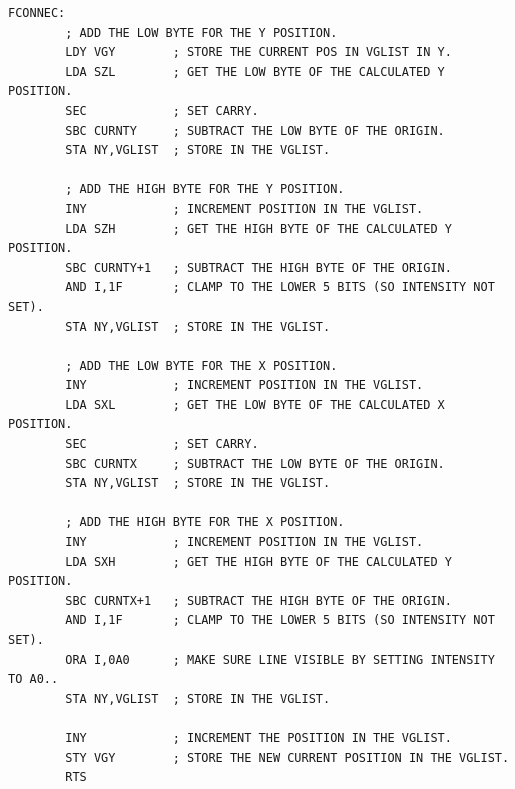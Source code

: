 \begin{lstlisting}
FCONNEC:
        ; ADD THE LOW BYTE FOR THE Y POSITION.
        LDY VGY        ; STORE THE CURRENT POS IN VGLIST IN Y.
        LDA SZL        ; GET THE LOW BYTE OF THE CALCULATED Y POSITION.
        SEC            ; SET CARRY.
        SBC CURNTY     ; SUBTRACT THE LOW BYTE OF THE ORIGIN.
        STA NY,VGLIST  ; STORE IN THE VGLIST.

        ; ADD THE HIGH BYTE FOR THE Y POSITION.
        INY            ; INCREMENT POSITION IN THE VGLIST.
        LDA SZH        ; GET THE HIGH BYTE OF THE CALCULATED Y POSITION.
        SBC CURNTY+1   ; SUBTRACT THE HIGH BYTE OF THE ORIGIN.
        AND I,1F       ; CLAMP TO THE LOWER 5 BITS (SO INTENSITY NOT SET).
        STA NY,VGLIST  ; STORE IN THE VGLIST.

        ; ADD THE LOW BYTE FOR THE X POSITION.
        INY            ; INCREMENT POSITION IN THE VGLIST.
        LDA SXL        ; GET THE LOW BYTE OF THE CALCULATED X POSITION.
        SEC            ; SET CARRY.
        SBC CURNTX     ; SUBTRACT THE LOW BYTE OF THE ORIGIN.
        STA NY,VGLIST  ; STORE IN THE VGLIST.

        ; ADD THE HIGH BYTE FOR THE X POSITION.
        INY            ; INCREMENT POSITION IN THE VGLIST.
        LDA SXH        ; GET THE HIGH BYTE OF THE CALCULATED Y POSITION.
        SBC CURNTX+1   ; SUBTRACT THE HIGH BYTE OF THE ORIGIN.
        AND I,1F       ; CLAMP TO THE LOWER 5 BITS (SO INTENSITY NOT SET).
        ORA I,0A0      ; MAKE SURE LINE VISIBLE BY SETTING INTENSITY TO A0..
        STA NY,VGLIST  ; STORE IN THE VGLIST.

        INY            ; INCREMENT THE POSITION IN THE VGLIST.
        STY VGY        ; STORE THE NEW CURRENT POSITION IN THE VGLIST.
        RTS
\end{lstlisting}

